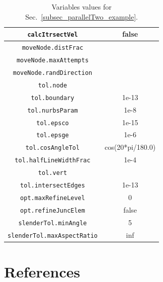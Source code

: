 \documentclass[11pt,letterpaper]{article}
\begin{document}
\begin{table}[!h]
\caption{Variables values for Sec.\ \ref{subsec_parallelTwo_example}. }

\label{tab_parallelTwo2}
\centering
\begin{tabular}{|c|c|}
\hline
\texttt{calcItrsectVel}  & false \\
\hline
\texttt{moveNode.distFrac} & \\ 
\hline
\texttt{moveNode.maxAttempts} &  \\
\hline
\texttt{moveNode.randDirection} & \\
\hline 
\texttt{tol.node} & \\
\hline
\texttt{tol.boundary} & 1e-13\\
\hline
\texttt{tol.nurbsParam} & 1e-8\\
\hline
\texttt{tol.epsco} & 1e-15\\
\hline
\texttt{tol.epsge} & 1e-6\\
\hline
\texttt{tol.cosAngleTol} & cos(20*pi/180.0)\\
\hline
\texttt{tol.halfLineWidthFrac} &  1e-4\\
\hline
\texttt{tol.vert} & \\
\hline
\texttt{tol.intersectEdges} & 1e-13\\
\hline
\texttt{opt.maxRefineLevel} & 0\\
\hline
\texttt{opt.refineJuncElem} & false\\
\hline
\texttt{slenderTol.minAngle} & 5\\
\hline
\texttt{slenderTol.maxAspectRatio} & inf\\
\hline
\end{tabular}
\end{table}

\FloatBarrier
\section{References}

    
\end{document}
